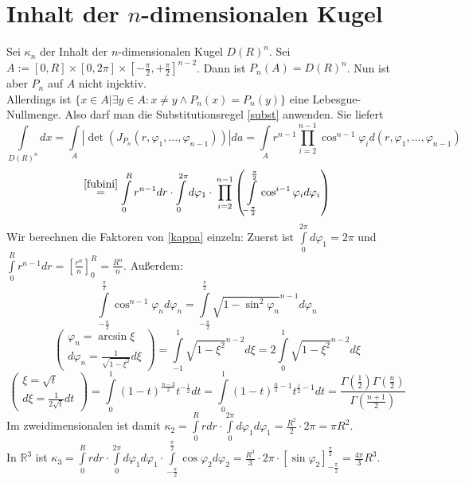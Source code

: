 \documentclass[a4paper,11pt]{report}
\theoremstyle{definition}
\newcommand{\R}{{\ensuremath{\mathbb{R}}}}
\begin{document}
\section{Inhalt der $n$-dimensionalen Kugel}
Sei $\kappa_n$ der Inhalt der $n$-dimensionalen Kugel $D(R)^n$. Sei $A:=[0,R]\times[0,2\pi]\times[-\frac{\pi}{2},+\frac{\pi}{2}]^{n-2}$. Dann ist $P_n(A)=D(R)^n$. Nun ist aber $P_n$ auf $A$ nicht injektiv.\\
Allerdings ist $\{x\in A|\exists y\in A: x\neq y \wedge P_n(x)=P_n(y)\}$ eine Lebesgue-Nullmenge. Also darf man die Substitutionsregel \eqref{subst} anwenden. Sie liefert
\[\int\limits_{D(R)^n}dx=\int\limits_A |\det(J_{P_n}(r,\varphi_1,\ldots,\varphi_{n-1}))|da=
\int\limits_A r^{n-1}\prod\limits_{i=2}^{n-1}\cos^{n-1}\varphi_i d(r,\varphi_1,\ldots,\varphi_{n-1}) \]
\begin{equation}\label{kappa}\stackrel{\eqref{fubini}}{=}\int\limits_0^R r^{n-1}dr\cdot\int\limits_0^{2\pi}d\varphi_1\cdot \\ \prod\limits_{i=2}^{n-1}\left(\int\limits_{-\frac{\pi}{2}}^\frac{\pi}{2} \cos^{i-1}\varphi_i d\varphi_i\right)
\end{equation}
Wir berechnen die Faktoren von \eqref{kappa} einzeln:
Zuerst ist $\int\limits_0^{2\pi}d\varphi_1=2\pi$ und $\int\limits_0^R r^{n-1}dr=\left[\frac{r^n}{n}\right]_0^R=\frac{R^n}{n}$. Außerdem:
$$\int\limits_{-\frac{\pi}{2}}^\frac{\pi}{2} \cos^{n-1}\varphi_n d\varphi_n=\int\limits_{-\frac{\pi}{2}}^\frac{\pi}{2} \sqrt{1-\sin^2\varphi_n}^{n-1} d\varphi_n$$
$$\left( \begin{array}{c} \varphi_n= \arcsin \xi \\ d\varphi_n = \frac{1}{\sqrt{1-\xi^2}}d\xi\end{array}\right)
=\int\limits_{-1}^1 \sqrt{1-\xi^2}^{n-2}d\xi=2\int\limits_0^1\sqrt{1-\xi^2}^{n-2}d\xi$$
$$\left( \begin{array}{c} \xi= \sqrt{t} \\ d\xi = \frac{1}{2\sqrt{t}}dt\end{array}\right)
=\int\limits_0^1 (1-t)^\frac{n-2}{2}t^{-\frac{1}{2}}dt = \int\limits_0^1 (1-t)^{\frac{n}{2}-1}t^{\frac{1}{2}-1}dt
=\frac{\Gamma(\frac{1}{2})\Gamma(\frac{n}{2})}{\Gamma(\frac{n+1}{2})}$$
Im zweidimensionalen ist damit $\kappa_2=\int\limits_0^R rdr\cdot \int\limits_0^{2\pi}d\varphi_1 d\varphi_1=\frac{R^2}{2}\cdot 2\pi=\pi R^2$.\\
In $\R^3$ ist $\kappa_3=\int\limits_0^R rdr\cdot \int\limits_0^{2\pi}d\varphi_1 d\varphi_1\cdot \int\limits_{-\frac{\pi}{2}}^\frac{\pi}{2} \cos\varphi_2 d\varphi_2=\frac{R^3}{3}\cdot 2\pi\cdot[\sin\varphi_2]_{-\frac{\pi}{2}}^\frac{\pi}{2}=\frac{4\pi}{3} R^3$.
\end{document}
